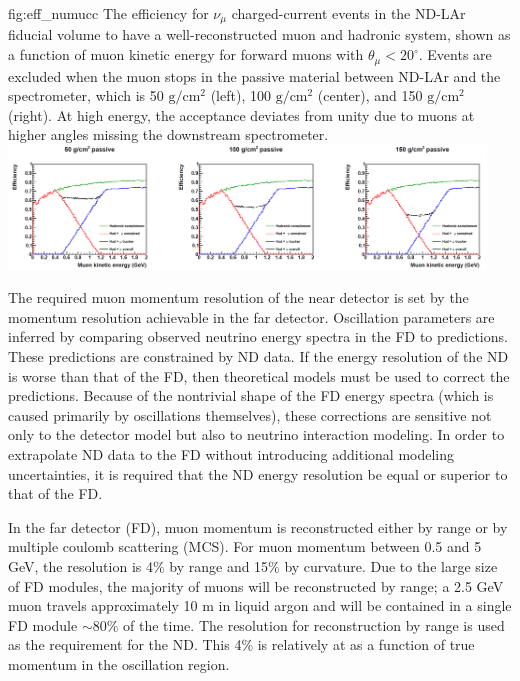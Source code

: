 \begin{dunefigure}{fig:eff_numucc}
{The efficiency for $\nu_\mu$ charged-current events in the ND-LAr fiducial volume to have a well-reconstructed muon and hadronic system, shown as a function of muon kinetic energy for forward muons with $\theta_\mu< 20^\circ$. Events are excluded when the muon stops in the passive material between ND-LAr and the spectrometer, which is 50 $\mbox{g}/\mbox{cm}^2$ (left), 100 $\mbox{g}/\mbox{cm}^2$ (center), and 150 $\mbox{g}/\mbox{cm}^2$ (right). At high energy, the acceptance deviates from unity due to muons at higher angles missing the downstream spectrometer.}
\includegraphics[width=0.95\textwidth]{graphics/cryostat/numu_cc_efficiency.png}
\end{dunefigure}

The required muon momentum resolution of the near detector is set by the momentum resolution achievable in the far detector. Oscillation parameters are inferred by comparing observed neutrino energy spectra in the FD to predictions. These predictions are constrained by ND data. If the energy resolution of the ND is worse than that of the FD, then theoretical models must be used to correct the predictions. Because of the nontrivial shape of the FD energy spectra (which is caused primarily by oscillations themselves), these corrections are sensitive not only to the detector model but also to neutrino interaction modeling. In order to extrapolate ND data to the FD without introducing additional modeling uncertainties, it is required that the ND energy resolution be equal or superior to that of the FD.

In the far detector (FD), muon momentum is reconstructed either by range or by multiple coulomb scattering (MCS). For muon momentum between 0.5 and 5 GeV, the resolution is 4\% by range and 15\% by curvature. Due to the large size of FD modules, the majority of muons will be reconstructed by range; a 2.5 GeV muon travels approximately 10 m in liquid argon and will be contained in a single FD module $\sim 80\%$ of the time. The resolution for reconstruction by range is used as the requirement for the ND. This 4\% is relatively at as a function of true momentum in the oscillation region. 

